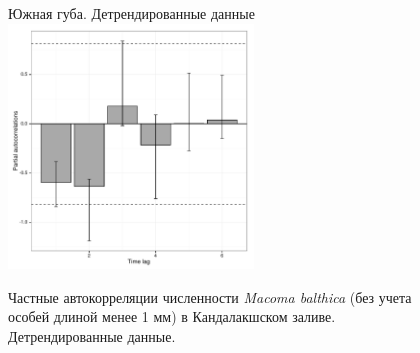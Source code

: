 \documentclass[12pt, a4paper]{disser}
\begin{document}
\begin{figure}[ht]
	\begin{minipage}[b]{.46\linewidth}
	\begin{center}
	{\tiny Южная губа. Детрендированные данные}
	\includegraphics[width=65mm]{../White_Sea/dynamic_N_N1/boot_PRCF_YuG_detrend.pdf}
	\end{center}
	\end{minipage}
%
	\hfil %
%

	\caption{Частные автокорреляции численности {\it Macoma balthica} (без учета особей длиной менее 1 мм) в Кандалакшском заливе. Детрендированные данные.}
	\label{ris:boot_PRCF_Kandalaksha_N2_}
	\end{figure}
\end{document}
